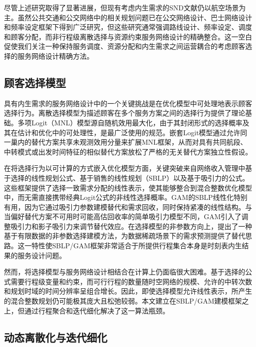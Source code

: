 尽管上述研究取得了显著进展，但现有考虑内生需求的SND文献仍以航空场景为主。虽然公共交通和公交网络中的相关规划问题已在公交网络设计、巴士网络设计和频率设定框架下得到广泛研究\citep{ceder1986bus, ceder2007public, guihaire2008transit, farahani2013review, laporte2011game}，但这些研究通常强调路线设计、频率设定、调度和顾客分配，而非行程级离散选择与资源约束服务网络设计的精确整合。这一空白促使我们关注一种保持服务调度、资源分配和内生需求之间运营耦合的考虑顾客选择的服务网络设计精确方法。

\subsection{顾客选择模型}

具有内生需求的服务网络设计中的一个关键挑战是在优化模型中可处理地表示顾客选择行为。离散选择模型为描述顾客在多个服务方案之间的选择行为提供了理论基础。多项Logit（MNL）模型源自随机效用最大化，由于其封闭形式的选择概率及其在估计和优化中的可处理性，是最广泛使用的规范\citep{mcfadden1974conditional, benakiva1985discrete}。嵌套Logit模型通过允许同一巢内的替代方案共享未观测效用分量来扩展MNL框架，从而对具有共同航段、中转模式或出发时间特征的相似替代方案放松了严格的无关替代方案独立性假设\citep{mcfadden1978modeling, benakiva1985discrete}。

在将选择行为以可计算的方式嵌入优化模型方面，关键突破来自网络收入管理中基于选择的线性规划公式\citep{liu2008choice, talluri2004theory}、基于销售的线性规划（SBLP）\citep{gallego2015general}以及基于吸引力的公式\citep{di2014attractiveness}。这些框架提供了选择一致需求分配的线性表示，使其能够整合到混合整数优化模型中，而无需直接携带经典Logit公式的非线性选择概率。GAM的SBLP线性化特别有用，因为它通过吸引力参数建模替代和需求回收，同时保持紧凑的线性结构。与当偏好替代方案不可用时可能高估回收率的简单吸引力模型不同，GAM引入了调整吸引力和影子吸引力来调节替代效应\citep{gallego2015general}。在选择模型的非参数方向上，\citet{farias2013nonparametric}提出了一种基于有限数据的非参数选择建模方法，为数据稀疏场景下的需求预测提供了替代思路。这一特性使SBLP/GAM框架非常适合于所提供行程集合本身是时刻表内生结果的服务设计问题。

然而，将选择模型与服务网络设计相结合在计算上仍面临很大困难。基于选择的公式需要行程级变量和约束，而可行行程的数量随时空网络的规模、允许的中转次数和规划时域的时间分辨率呈组合增长。因此，即使选择模型允许线性表示，所产生的混合整数规划仍可能极其庞大且松弛较弱。本文建立在SBLP/GAM建模框架之上，但通过行程聚合和迭代细化解决了这一算法瓶颈。

\subsection{动态离散化与迭代细化}


